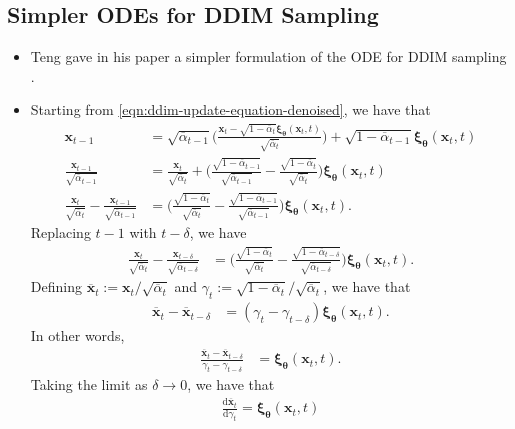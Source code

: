 \documentclass[10pt]{article}
\newcommand{\dee}{\mathrm{d}}
\newcommand{\ve}[1]{\mathbf{#1}}
\newcommand{\ves}[1]{\boldsymbol{#1}}
\newcommand{\ov}[1]{\overline{#1}}
\begin{document}
\subsection{Simpler ODEs for DDIM Sampling} \label{sec:simpler-odes}

\begin{itemize}
  \item Teng gave in his paper a simpler formulation of the ODE for DDIM sampling \cite{Wizadwongsa:2023}.
  
  \item Starting from \eqref{eqn:ddim-update-equation-denoised}, we have that
  \begin{align*}
    \ve{x}_{t-1} 
    &= \sqrt{\ov{\alpha}_{t-1}} \bigg( \frac{\ve{x}_t - \sqrt{1 - \ov{\alpha}_t} \ves{\xi}_{\ves{\theta}}(\ve{x}_t, t) }{\sqrt{\ov{\alpha}_t}} \bigg) + \sqrt{1 - \ov{\alpha}_{t-1}} \ves{\xi}_{\ves{\theta}}(\ve{x}_t, t) \\
    \frac{\ve{x}_{t-1}}{\sqrt{\ov{\alpha}_{t-1}}} 
    &= \frac{\ve{x}_t}{\sqrt{\ov{\alpha}_t}} + \bigg( \frac{\sqrt{1 - \ov{\alpha}_{t-1}}}{\sqrt{\ov{\alpha}_{t-1}}} - \frac{\sqrt{1 - \ov{\alpha}_{t}}}{\sqrt{\ov{\alpha}_{t}}} \bigg) \ves{\xi}_{\ves{\theta}}(\ve{x}_t, t) \\
    \frac{\ve{x}_{t}}{\sqrt{\ov{\alpha}_{t}}} - \frac{\ve{x}_{t-1}}{\sqrt{\ov{\alpha}_{t-1}}}  
    &= \bigg( \frac{\sqrt{1 - \ov{\alpha}_{t}}}{\sqrt{\ov{\alpha}_{t}}} - \frac{\sqrt{1 - \ov{\alpha}_{t-1}}}{\sqrt{\ov{\alpha}_{t-1}}} \bigg) \ves{\xi}_{\ves{\theta}}(\ve{x}_t, t).
  \end{align*}
  Replacing $t - 1$ with $t - \delta$, we have
  \begin{align*}
    \frac{\ve{x}_{t}}{\sqrt{\ov{\alpha}_{t}}} - \frac{\ve{x}_{t-\delta}}{\sqrt{\ov{\alpha}_{t-\delta}}}  
    &= \bigg( \frac{\sqrt{1 - \ov{\alpha}_{t}}}{\sqrt{\ov{\alpha}_{t}}} - \frac{\sqrt{1 - \ov{\alpha}_{t-\delta}}}{\sqrt{\ov{\alpha}_{t-\delta}}} \bigg) \ves{\xi}_{\ves{\theta}}(\ve{x}_t, t).
  \end{align*}
  Defining $\ov{\ve{x}}_t := \ve{x}_t / \sqrt{\ov{\alpha}_t}$ and $\gamma_t := \sqrt{1-\ov{\alpha}_t}/\sqrt{\ov{\alpha}_t}$, we have that
  \begin{align} \label{eqn:ddim-difference-equation-noise}
    \ov{\ve{x}}_t - \ov{\ve{x}}_{t-\delta} &= (\gamma_t - \gamma_{t-\delta}) \ves{\xi}_{\ves{\theta}}(\ve{x}_t, t).
  \end{align}
  In other words,
  \begin{align*}
    \frac{\ov{\ve{x}}_t - \ov{\ve{x}}_{t-\delta}}{\gamma_t - \gamma_{t-\delta}} &=  \ves{\xi}_{\ves{\theta}}(\ve{x}_t, t).
  \end{align*}
  Taking the limit as $\delta \rightarrow 0$, we have that
  \begin{align} \label{eqn:simpler-ddim-ode-noise}
    \frac{\dee \ov{\ve{x}}_t}{\dee \gamma_t} = \ves{\xi}_{\ves{\theta}}(\ve{x}_t, t)
  \end{align}


\end{itemize}
\end{document}
